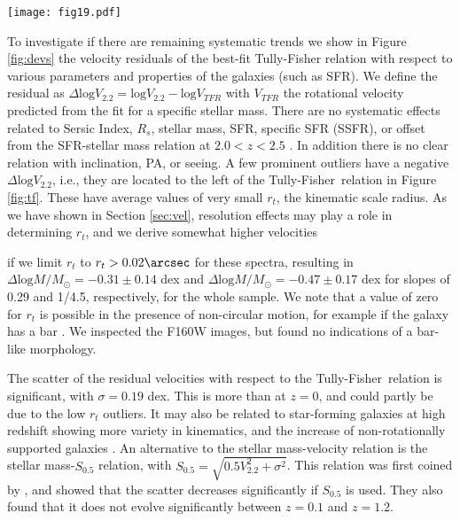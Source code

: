 \documentclass{emulateapj}
\newcommand{\tf}{Tully-Fisher}
\begin{document}
\begin{figure*}
\texttt{[image: fig19.pdf]}
\caption{Difference between the observed velocity and the velocity predicted by the best-fit \tf\ relation. We plot against model and observational parameters. From left to right, top to bottom: SNR, log $V_{2.2}$, log stellar mass, best-fit $R_s$, best-fit $r_t$,  best-fit $\sigma$, redshift, inclination, $\Delta\alpha$, Sersic index, SFR, SFR minus predicted SFR at $2.0<z<2.5$ \citep{Tomczak15}, SSFR, seeing and $R_s$ relative to the seeing. We find almost no correlations, except for best-fit $r_t$, with a negative offset in $\Delta$log$V_{2.2}$ for fits with $r_t\approx0$.}
\label{fig:devs}
\end{figure*}

To investigate if there are remaining systematic trends we show in Figure \ref{fig:devs} the velocity residuals of the best-fit Tully-Fisher relation with respect to various parameters and properties of the galaxies (such as SFR). We define the residual as $\Delta \mathrm{log} V_{2.2} = \mathrm{log} V_{2.2} - \mathrm{log} V_{TFR}$ with $V_{TFR}$ the rotational velocity predicted from the fit for a specific stellar mass. There are no systematic effects related to Sersic Index, $R_s$, stellar mass, SFR, specific SFR (SSFR), or offset from the SFR-stellar mass relation at $2.0<z<2.5$ \citep{Tomczak15}. In addition there is no clear relation with inclination, PA, or seeing. A few prominent outliers have a negative $\Delta \mathrm{log} V_{2.2}$, i.e., they are located to the left of the \tf\ relation in Figure \ref{fig:tf}. These have average values of very small $r_t$, the kinematic scale radius. As we have shown in Section \ref{sec:vel}, resolution effects may play a role in determining $r_t$, and we derive somewhat higher velocities {if we limit $r_t$ to $r_t > 0.02\arcsec$ for these spectra, resulting in $\Delta \mathrm{log}M/M_{\odot}=-0.31\pm0.14$ dex {and $\Delta \mathrm{log}M/M_{\odot}=-0.47\pm0.17$ dex for slopes of 0.29 and 1/4.5, respectively, for the whole sample. We note that a value of zero for $r_t$ is possible in the presence of non-circular motion, for example if the galaxy has a bar \citep{Franx92}. We inspected the F160W images, but found no indications of a bar-like morphology.}

The scatter of the residual velocities with respect to the \tf\ relation is significant, with {$\sigma=0.19$} dex. This is more than at $z=0$, and {could partly be due to the low $r_t$ outliers. It} may {also} be related to star-forming galaxies at high redshift showing more variety in kinematics, and the increase of non-rotationally supported galaxies \citep[e.g.][]{Kassin07}. An alternative to the stellar mass-velocity relation is the stellar mass-$S_{0.5}$ relation, with $S_{0.5}=\sqrt{0.5V_{2.2}^2+\sigma^2}$. This relation was first coined by \citet{Weiner06a}, and \citet{Kassin07} showed that the scatter decreases significantly if $S_{0.5}$ is used. They also found that it does not evolve significantly between $z=0.1$ and $z=1.2$.

}
\end{document}
